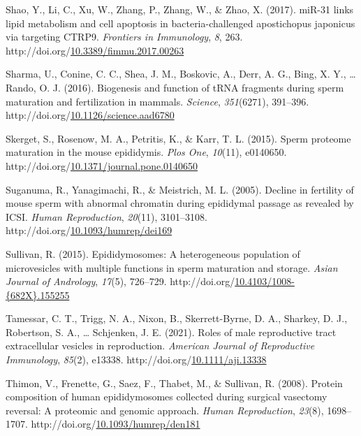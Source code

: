 \documentclass[12pt,twoside]{reedthesis}
\newlength{\cslhangindent}
\newenvironment{CSLReferences}[2] %
 {%
  \setlength{\parindent}{0pt}
  \ifodd #1 \everypar{\setlength{\hangindent}{\cslhangindent}}\ignorespaces\fi
  \ifnum #2 > 0
  \setlength{\parskip}{#2\baselineskip}
  \fi
 }%
 {}
\begin{document}
\begin{CSLReferences}{1}{0}
\leavevmode{}%
Shao, Y., Li, C., Xu, W., Zhang, P., Zhang, W., \& Zhao, X. (2017). {miR}-31 links lipid metabolism and cell apoptosis in bacteria-challenged apostichopus japonicus via targeting {CTRP9}. \emph{Frontiers in Immunology}, \emph{8}, 263. http://doi.org/\href{https://doi.org/10.3389/fimmu.2017.00263}{10.3389/fimmu.2017.00263}

\leavevmode{}%
Sharma, U., Conine, C. C., Shea, J. M., Boskovic, A., Derr, A. G., Bing, X. Y., \ldots{} Rando, O. J. (2016). Biogenesis and function of {tRNA} fragments during sperm maturation and fertilization in mammals. \emph{Science}, \emph{351}(6271), 391--396. http://doi.org/\href{https://doi.org/10.1126/science.aad6780}{10.1126/science.aad6780}

\leavevmode{}%
Skerget, S., Rosenow, M. A., Petritis, K., \& Karr, T. L. (2015). Sperm proteome maturation in the mouse epididymis. \emph{Plos One}, \emph{10}(11), e0140650. http://doi.org/\href{https://doi.org/10.1371/journal.pone.0140650}{10.1371/journal.pone.0140650}

\leavevmode{}%
Suganuma, R., Yanagimachi, R., \& Meistrich, M. L. (2005). Decline in fertility of mouse sperm with abnormal chromatin during epididymal passage as revealed by {ICSI}. \emph{Human Reproduction}, \emph{20}(11), 3101--3108. http://doi.org/\href{https://doi.org/10.1093/humrep/dei169}{10.1093/humrep/dei169}

\leavevmode{}%
Sullivan, R. (2015). Epididymosomes: A heterogeneous population of microvesicles with multiple functions in sperm maturation and storage. \emph{Asian Journal of Andrology}, \emph{17}(5), 726--729. http://doi.org/\href{https://doi.org/10.4103/1008-\%7B682X\%7D.155255}{10.4103/1008-\{682X\}.155255}

\leavevmode{}%
Tamessar, C. T., Trigg, N. A., Nixon, B., Skerrett-Byrne, D. A., Sharkey, D. J., Robertson, S. A., \ldots{} Schjenken, J. E. (2021). Roles of male reproductive tract extracellular vesicles in reproduction. \emph{American Journal of Reproductive Immunology}, \emph{85}(2), e13338. http://doi.org/\href{https://doi.org/10.1111/aji.13338}{10.1111/aji.13338}

\leavevmode{}%
Thimon, V., Frenette, G., Saez, F., Thabet, M., \& Sullivan, R. (2008). Protein composition of human epididymosomes collected during surgical vasectomy reversal: A proteomic and genomic approach. \emph{Human Reproduction}, \emph{23}(8), 1698--1707. http://doi.org/\href{https://doi.org/10.1093/humrep/den181}{10.1093/humrep/den181}


\end{CSLReferences}
\end{document}
